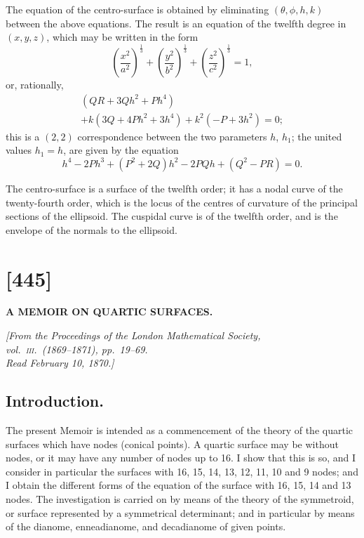 \documentclass[11pt,a4paper]{article}
\begin{document}
The equation of the centro-surface is obtained by eliminating $(\theta, \phi, h, k)$ between the above equations. The result is an equation of the twelfth degree in $(x, y, z)$, which may be written in the form
\[
\left(\frac{x^2}{a^2}\right)^{\!\frac{1}{3}} + \left(\frac{y^2}{b^2}\right)^{\!\frac{1}{3}} + \left(\frac{z^2}{c^2}\right)^{\!\frac{1}{3}} = 1,
\]
or, rationally,
\begin{multline*}
(QR + 3Qh^2 + Ph^4) \\
+ k(3Q + 4Ph^2 + 3h^4) + k^2(-P + 3h^2) = 0;
\end{multline*}
this is a $(2, 2)$ correspondence between the two parameters $h$, $h_1$; the united values $h_1 = h$, are given by the equation
\[
h^4 - 2Ph^3 + (P^2 + 2Q)h^2 - 2PQh + (Q^2 - PR) = 0.
\]

The centro-surface is a surface of the twelfth order; it has a nodal curve of the twenty-fourth order, which is the locus of the centres of curvature of the principal sections of the ellipsoid. The cuspidal curve is of the twelfth order, and is the envelope of the normals to the ellipsoid.

\newpage
\section*{[445]}

\begin{center}
\textbf{\Large A MEMOIR ON QUARTIC SURFACES.}
\end{center}

\begin{flushright}
\textit{[From the \textit{Proceedings of the London Mathematical Society},}\\
\textit{vol.\ \textsc{iii}.\ (1869--1871), pp.\ 19--69.}\\
\textit{Read February 10, 1870.]}
\end{flushright}

\vspace{1em}

\subsection*{Introduction.}

The present Memoir is intended as a commencement of the theory of the quartic surfaces which have nodes (conical points). A quartic surface may be without nodes, or it may have any number of nodes up to 16. I show that this is so, and I consider in particular the surfaces with 16, 15, 14, 13, 12, 11, 10 and 9 nodes; and I obtain the different forms of the equation of the surface with 16, 15, 14 and 13 nodes. The investigation is carried on by means of the theory of the symmetroid, or surface represented by a symmetrical determinant; and in particular by means of the dianome, enneadianome, and decadianome of given points.
\end{document}
